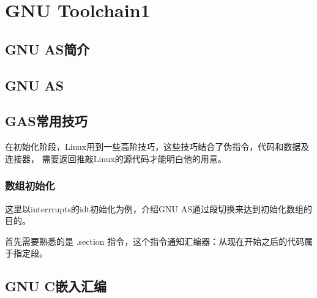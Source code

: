 \chapter{GNU Toolchain1}


\section{GNU AS简介}
\section{GNU AS}
\section{GAS常用技巧}
在初始化阶段，Linux用到一些高阶技巧，这些技巧结合了伪指令，代码和数据及连接器，
需要返回推敲Linux的源代码才能明白他的用意。
\subsection{数组初始化}
这里以interrrupts的idt初始化为例，介绍GNU AS通过段切换来达到初始化数组的目的。

首先需要熟悉的是 .section 指令，这个指令通知汇编器：从现在开始之后的代码属于指定段。
\section{GNU C嵌入汇编}
